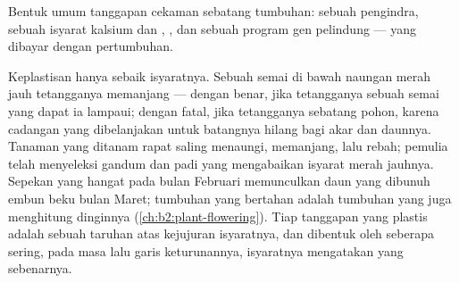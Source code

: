 \begin{omfigure}

{\small Bentuk umum tanggapan cekaman sebatang tumbuhan: sebuah
pengindra, sebuah isyarat kalsium dan , , dan sebuah program gen pelindung --- yang dibayar dengan
pertumbuhan.}
\end{omfigure}

\begin{example}\label{ex:b2:plant-plasticity:lie}
Keplastisan hanya sebaik isyaratnya. Sebuah semai di bawah naungan
merah jauh tetangganya memanjang --- dengan benar, jika tetangganya
sebuah semai yang dapat ia lampaui; dengan fatal, jika tetangganya
sebatang pohon, karena cadangan yang dibelanjakan untuk batangnya
hilang bagi akar dan daunnya. Tanaman yang ditanam rapat saling
menaungi, memanjang, lalu rebah; pemulia telah menyeleksi gandum dan
padi yang mengabaikan isyarat merah jauhnya. Sepekan yang hangat pada
bulan Februari memunculkan daun yang dibunuh embun beku bulan Maret;
tumbuhan yang bertahan adalah tumbuhan yang juga menghitung dinginnya
(\cref{ch:b2:plant-flowering}). Tiap tanggapan yang plastis adalah
sebuah taruhan atas kejujuran isyaratnya, dan  dibentuk
oleh seberapa sering, pada masa lalu garis keturunannya, isyaratnya
mengatakan yang sebenarnya.
\end{example}

